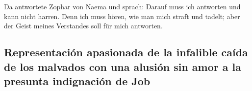  Da antwortete Zophar von Naema und sprach: 
Darauf muss ich antworten und kann nicht harren.  Denn ich
muss hören, wie man mich straft und tadelt; aber der Geist meines
Verstandes soll für mich antworten.

\hypertarget{representaciuxf3n-apasionada-de-la-infalible-cauxedda-de-los-malvados-con-una-alusiuxf3n-sin-amor-a-la-presunta-indignaciuxf3n-de-job}{%
\subsection{Representación apasionada de la infalible caída de los
malvados con una alusión sin amor a la presunta indignación de
Job}\label{representaciuxf3n-apasionada-de-la-infalible-cauxedda-de-los-malvados-con-una-alusiuxf3n-sin-amor-a-la-presunta-indignaciuxf3n-de-job}}

